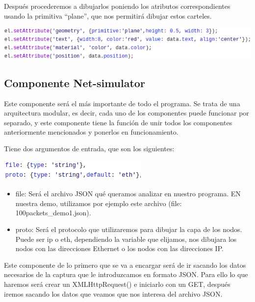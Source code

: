 \documentclass[a4paper, 12pt]{book}
\begin{document}
Después procederemos a dibujarlos poniendo los atributos correspondientes usando la primitiva “plane”, que nos permitirá dibujar estos carteles.

\begin{center}
    \includegraphics[scale=0.7]{img/atrib_comp_poster.png}
\end{center}

\newpage
\subsection{Componente Net-simulator}


Este componente será el más importante de todo el programa. Se trata de una arquitectura modular, es decir, cada uno de los componentes puede funcionar por separado, y este componente tiene la función de unir todos los componentes anteriormente mencionados y ponerlos en funcionamiento.

Tiene dos argumentos de entrada, que son los siguientes:

\begin{center}
    \includegraphics[scale=0.7]{img/arg_comp_netsim.png}
\end{center}

\begin{itemize}
    \item file: Será el archivo JSON qué queramos analizar en nuestro programa. EN nuestra demo, utilizamos por ejemplo este archivo (file: 100packets\_demo1.json).

    \item proto: Será el protocolo que utilizaremos para dibujar la capa de los nodos. Puede ser ip o eth, dependiendo la variable que elijamos, nos dibujara los nodos con las direcciones Ethernet o los nodos con las direcciones IP.

\end{itemize}


Este componente de lo primero que se va a encargar será de ir sacando los datos necesarios de la captura que le introduzcamos en formato JSON. Para ello lo que haremos será crear un XMLHttpRequest() e iniciarlo con un GET, después iremos sacando los datos que veamos que nos interesa del archivo JSON.
\end{document}

